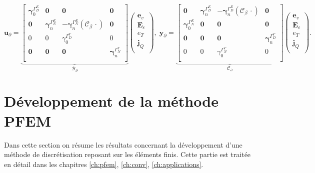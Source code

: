 \begin{equation*}
\bm{u}_\partial = 
\underbrace{\begin{bmatrix}
	\bm{\gamma}_{0}^{\Gamma_D^E} & \bm{0} & \bm{0} & \bm{0} \\
	\bm{0} & \bm{\gamma}_n^{\Gamma_N^E} & - \bm{\gamma}_n^{\Gamma_N^E}(\bm{\mathcal{C}}_\beta\, \cdot )  & \bm{0}  \\ 
	{0} & {0} & {\gamma}_{0}^{\Gamma_D^T} & {0} \\
	\bm{0} & \bm{0} & \bm{0} & \bm{\gamma}_{n}^{\Gamma_N^T} \\
	\end{bmatrix}}_{\mathcal{B}_\partial}
\begin{pmatrix}
\bm{e}_v \\
\bm{E}_\varepsilon \\
{e}_T \\
\bm{j}_Q \\
\end{pmatrix}, \; 
\bm{y}_\partial = 
\underbrace{\begin{bmatrix}
	\bm{0} & \bm{\gamma}_n^{\Gamma_D^E} & - \bm{\gamma}_n^{\Gamma_D^E}(\bm{\mathcal{C}}_\beta\, \cdot )  & \bm{0}  \\ 
	\bm{\gamma}_{0}^{\Gamma_N^E} & \bm{0} & \bm{0} & \bm{0} \\
	\bm{0} & \bm{0} & \bm{0} & \bm{\gamma}_{n}^{\Gamma_D^T} \\
	{0} & {0} & {\gamma}_{0}^{\Gamma_N^T} & {0} \\
	\end{bmatrix}}_{\mathcal{C}_\partial}
\begin{pmatrix}
\bm{e}_v \\
\bm{E}_\varepsilon \\
{e}_T \\
\bm{j}_Q \\
\end{pmatrix}.
\end{equation*} 

\section{Développement de la méthode PFEM}
Dans cette section on résume les résultats concernant la développement d'une méthode de discrétisation reposant sur les éléments finis. Cette partie est traitée en détail dans les chapitres \ref{ch:pfem}, \ref{ch:conv}, \ref{ch:applications}. \\

